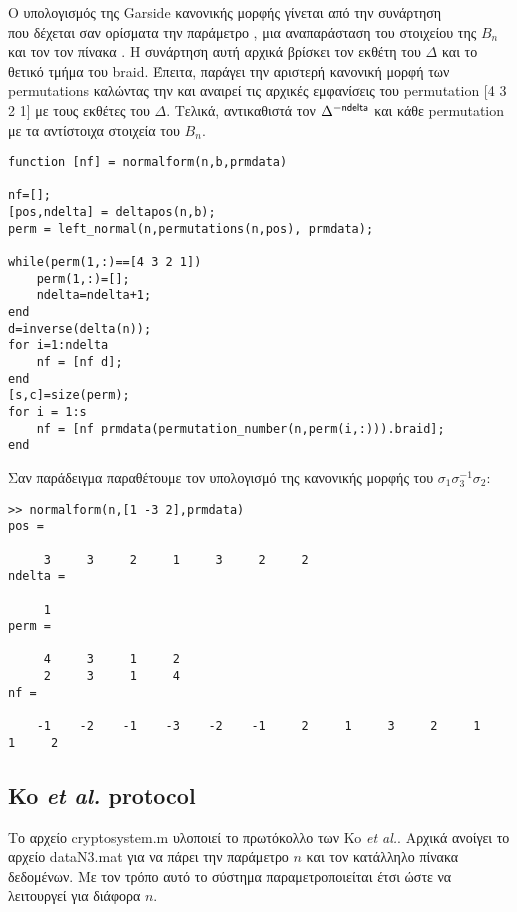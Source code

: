 Ο υπολογισμός της Garside κανονικής μορφής γίνεται από την συνάρτηση \\
 που δέχεται σαν ορίσματα την παράμετρο , μια αναπαράσταση  του στοιχείου της $ B_n $ και τον τον πίνακα .
Η συνάρτηση αυτή αρχικά βρίσκει τον εκθέτη  του $ \Delta $ και το θετικό τμήμα  του braid. Έπειτα, παράγει την αριστερή κανονική μορφή των permutations καλώντας την  και αναιρεί τις αρχικές εμφανίσεις του permutation [4 3 2 1] με τους εκθέτες του $ \Delta $. Τελικά, αντικαθιστά τον $ \Delta^{-\mathsf{ndelta}} $ και κάθε permutation με τα αντίστοιχα στοιχεία του $ B_n $.
\begin{lstlisting}
function [nf] = normalform(n,b,prmdata)

nf=[];
[pos,ndelta] = deltapos(n,b);
perm = left_normal(n,permutations(n,pos), prmdata);

while(perm(1,:)==[4 3 2 1])
    perm(1,:)=[];
    ndelta=ndelta+1;
end
d=inverse(delta(n));
for i=1:ndelta
    nf = [nf d];
end
[s,c]=size(perm);
for i = 1:s
    nf = [nf prmdata(permutation_number(n,perm(i,:))).braid];
end
\end{lstlisting}

Σαν παράδειγμα παραθέτουμε τον υπολογισμό της κανονικής μορφής του $ \sigma_1\sigma_3^{-1}\sigma_2 $:
\begin{lstlisting}
>> normalform(n,[1 -3 2],prmdata)
pos =

     3     3     2     1     3     2     2
ndelta =

     1
perm =

     4     3     1     2
     2     3     1     4
nf =

    -1    -2    -1    -3    -2    -1     2     1     3     2     1     1     2
\end{lstlisting}

\subsection{Ko \textit{et al.} protocol}

Το αρχείο cryptosystem.m υλοποιεί το πρωτόκολλο των Ko \textit{et al.}. Αρχικά ανοίγει το αρχείο dataN3.mat για να πάρει την παράμετρο $ n $ και τον κατάλληλο πίνακα δεδομένων. Με τον τρόπο αυτό το σύστημα παραμετροποιείται έτσι ώστε να λειτουργεί για διάφορα $ n $.

